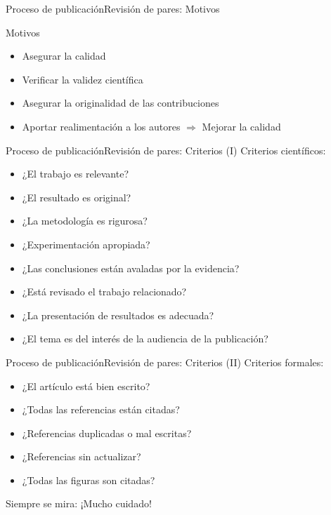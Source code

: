 \documentclass{beamer}
\begin{document}
\begin{frame}{Proceso de publicación}{Revisión de pares: Motivos}
   \begin{block}{Motivos}
   	\begin{itemize}
		\item Asegurar la calidad
		\item Verificar la validez científica
		\item Asegurar la originalidad de las contribuciones
		\item Aportar realimentación a los autores $\Rightarrow$ \alert{Mejorar la calidad}
	\end{itemize}
   \end{block}
\end{frame}

\begin{frame}{Proceso de publicación}{Revisión de pares: Criterios (I)}
	Criterios científicos:
   	\begin{itemize}
		\item ¿El trabajo es relevante? 
		\item ¿El resultado es original?
		\item ¿La metodología es rigurosa?
		\item ¿Experimentación apropiada?
		\item ¿Las conclusiones están avaladas por la evidencia?
		\item ¿Está revisado el trabajo relacionado?
		\item ¿La presentación de resultados es adecuada?
		\item ¿El tema es del interés de la audiencia de la publicación?
	\end{itemize}
\end{frame}

\begin{frame}{Proceso de publicación}{Revisión de pares: Criterios (II)}
	Criterios formales:
   	\begin{itemize}
		\item ¿El artículo está bien escrito?
		\item ¿Todas las referencias están citadas?
		\item ¿Referencias duplicadas o mal escritas?
		\item ¿Referencias sin actualizar?
		\item ¿Todas las figuras son citadas?
	\end{itemize}
	\alert{Siempre se mira: ¡Mucho cuidado!}
\end{frame}
\end{document}
